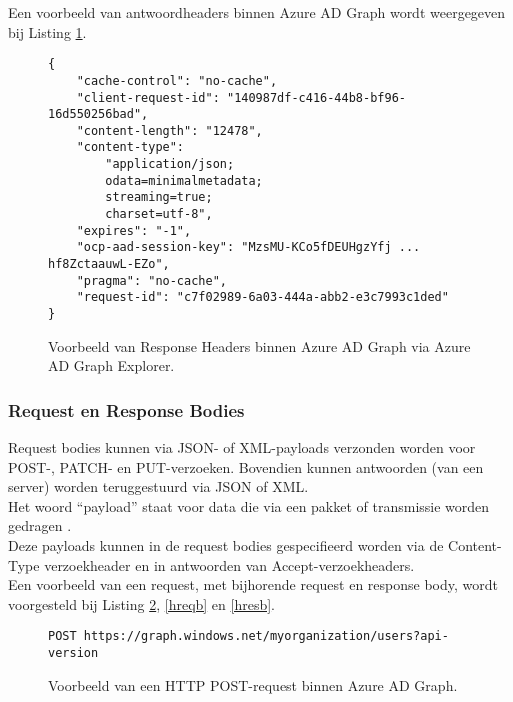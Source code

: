 Een voorbeeld van antwoordheaders binnen Azure \ac{AD} Graph wordt weergegeven bij Listing \ref{rhaad}. \\
\begin{figure}[h!]
    \scriptsize
    \begin{verbatim} 
{
    "cache-control": "no-cache",
    "client-request-id": "140987df-c416-44b8-bf96-16d550256bad",
    "content-length": "12478",
    "content-type": 
        "application/json; 
        odata=minimalmetadata; 
        streaming=true; 
        charset=utf-8",
    "expires": "-1",
    "ocp-aad-session-key": "MzsMU-KCo5fDEUHgzYfj ... hf8ZctaauwL-EZo",
    "pragma": "no-cache",
    "request-id": "c7f02989-6a03-444a-abb2-e3c7993c1ded"
}
    \end{verbatim}
    \caption[Voorbeeld Response Headers Azure AD Graph]{Voorbeeld van Response Headers binnen Azure \ac{AD} Graph via Azure \Ac{AD} Graph Explorer.}
    \label{rhaad}
\end{figure}

\subsubsection{Request en Response Bodies}

Request bodies kunnen via \Ac{JSON}- of \ac{XML}-payloads verzonden worden voor POST-, PATCH- en PUT-verzoeken. Bovendien kunnen antwoorden (van een server) worden teruggestuurd via \ac{JSON} of \ac{XML}. \\

Het woord “payload” staat voor data die via een pakket of transmissie worden gedragen \autocite{Comer2006}. \\

Deze payloads kunnen in de request bodies gespecifieerd worden via de Content-Type verzoekheader en in antwoorden van Accept-verzoekheaders. \\

Een voorbeeld van een request, met bijhorende request en response body, wordt voorgesteld bij Listing \ref{hpr}, \ref{hreqb} en \ref{hresb}. \\

\begin{figure}[h!]
    \scriptsize
    \begin{verbatim}
POST https://graph.windows.net/myorganization/users?api-version
    \end{verbatim}
    \caption[Voorbeeld HTTP POST-request]{Voorbeeld van een \ac{HTTP} POST-request binnen Azure \ac{AD} Graph.}
    \label{hpr}
\end{figure}

